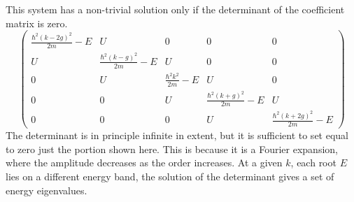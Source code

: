 \documentclass[10.75pt,a4paper,openright,bottom=2cm]{article}
\renewcommand{\Vec}[1]{\boldsymbol{#1}}
\begin{document}
This system has a non-trivial solution only if the determinant of the coefficient matrix is zero.
\[
\left(\begin{array}{ccccc}
    \frac{\hbar^2(k-2g)^2}{2m}-E & U & 0 & 0 & 0 \\
    U & \frac{\hbar^2(k-g)^2}{2m}-E & U & 0 & 0 \\
    0 & U & \frac{\hbar^2k^2}{2m}-E & U & 0 \\
    0 & 0 & U & \frac{\hbar^2(k+g)^2}{2m}-E & U \\
    0 & 0 & 0 & U & \frac{\hbar^2(k+2g)^2}{2m}-E
\end{array}\right)
\]
The determinant is in principle infinite in extent, but it is sufficient to set equal to zero just the portion shown here. This is because it is a Fourier expansion, where the amplitude decreases as the order increases. At a given $k$, each root $E$ lies on a different energy band, the solution of the determinant gives a set of energy eigenvalues.
\end{document}

